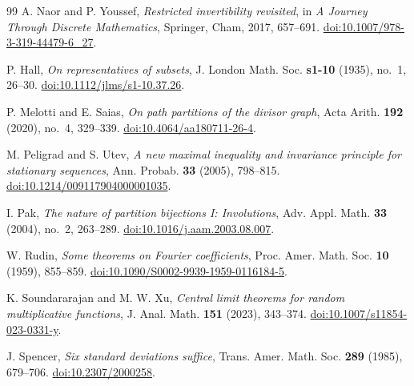 \documentclass[11pt]{amsart}
\numberwithin{equation}{section}
\theoremstyle{plain}
\theoremstyle{definition}
\theoremstyle{remark}
\begin{document}
\begin{thebibliography}{99}
A. Naor and P. Youssef,
\emph{Restricted invertibility revisited},
in \emph{A Journey Through Discrete Mathematics}, Springer, Cham, 2017,
657--691.
\href{https://doi.org/10.1007/978-3-319-44479-6_27}%
{doi:10.1007/978-3-319-44479-6\_27}.

P. Hall,
\emph{On representatives of subsets},
J. London Math. Soc. \textbf{s1-10} (1935), no.~1, 26--30.
\href{https://doi.org/10.1112/jlms/s1-10.37.26}%
{doi:10.1112/jlms/s1-10.37.26}.

P. Melotti and E. Saias,
\emph{On path partitions of the divisor graph},
Acta Arith. \textbf{192} (2020), no.~4, 329--339.
\href{https://doi.org/10.4064/aa180711-26-4}%
{doi:10.4064/aa180711-26-4}.

M. Peligrad and S. Utev,
\emph{A new maximal inequality and invariance principle for stationary
sequences},
Ann. Probab. \textbf{33} (2005), 798--815.
\href{https://doi.org/10.1214/009117904000001035}{doi:10.1214/009117904000001035}.

I. Pak,
\emph{The nature of partition bijections I: Involutions},
Adv. Appl. Math. \textbf{33} (2004), no.~2, 263--289.
\href{https://doi.org/10.1016/j.aam.2003.08.007}%
{doi:10.1016/j.aam.2003.08.007}.

W. Rudin,
\emph{Some theorems on Fourier coefficients},
Proc. Amer. Math. Soc. \textbf{10} (1959), 855--859.
\href{https://doi.org/10.1090/S0002-9939-1959-0116184-5}{doi:10.1090/S0002-9939-1959-0116184-5}.

K. Soundararajan and M. W. Xu,
\emph{Central limit theorems for random multiplicative functions},
J. Anal. Math. \textbf{151} (2023), 343--374.
\href{https://doi.org/10.1007/s11854-023-0331-y}{doi:10.1007/s11854-023-0331-y}.

J. Spencer,
\emph{Six standard deviations suffice},
Trans. Amer. Math. Soc. \textbf{289} (1985), 679--706.
\href{https://doi.org/10.2307/2000258}{doi:10.2307/2000258}.

\end{thebibliography}
\end{document}
